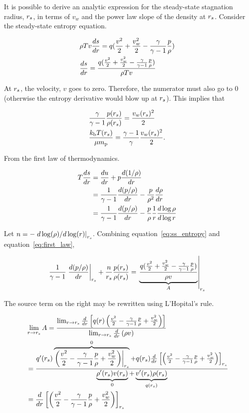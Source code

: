 It is possible to derive an analytic expression for the steady-state
stagnation radius, $r_s$, in terms of $v_w$ and the power law slope of
the density at $r_s$.  Consider the steady-state entropy equation.

\begin{align}
&\rho T v \frac{d s}{d r}=q (\frac{v^2}{2}+\frac{v_w^2}{2}-\frac{\gamma}{\gamma-1} \frac{p}{\rho})\\
&\frac{d s}{d r}=\frac{q (\frac{v^2}{2}+\frac{v_w^2}{2}-\frac{\gamma}{\gamma-1} \frac{p}{\rho})}{\rho T v} \label{eq:ss_entropy}
\end{align}

At $r_s$, the velocity, $v$ goes to zero.  Therefore, the numerator
must also go to 0 (otherwise the entropy derivative would blow up at
$r_s$). This implies that

\begin{align}
 &\frac{\gamma}{\gamma-1} \frac{p(r_s)}{\rho(r_s)}=\frac{v_w(r_s)^2}{2} \\
 &\frac{k_{\rm b} T(r_s)}{\mu m_{\rm p}}=\frac{\gamma-1}{\gamma} \frac{v_w(r_s)^2}{2} .
\label{eq:appTanalytic}
\end{align}

From the first law of thermodynamics.

\begin{align}
T\frac{d s}{d r}&=\frac{d u}{d r}+p\frac{d (1/\rho)}{d r}\\
&=\frac{1}{\gamma-1}\frac{d (p/\rho)}{d r}-\frac{p}{\rho^2}\frac{d \rho}{d r}\\
&=\frac{1}{\gamma-1}\frac{d (p/\rho)}{d r}-\frac{p}{\rho} \frac{1}{r} \frac{d \log{\rho}}{d \log{r}} \label{eq:first_law}
\end{align}

Let $n=-\left.d\log(\rho)/d\log(r)\right|_{r_s}$. Combining equation~\ref{eq:ss_entropy} and equation~\ref{eq:first_law},

\begin{align}
\frac{1}{\gamma-1}\left.\frac{d (p/\rho)}{d r}\right|_{r_s}+\frac{n}{r_s}  \frac{p(r_s)}{\rho(r_s)}=\left.\underbrace{\frac{q (\frac{v^2}{2}+\frac{v_w^2}{2}-\frac{\gamma}{\gamma-1} \frac{p}{\rho})}{\rho  v}}_{A}\right|_{r_s} \label{eq:combo1}
\end{align}

The source term on the right may be rewritten using L'Hopital's rule. 

\begin{align}
  &\lim_{r \rightarrow r_s} A=\frac{\lim_{r \rightarrow r_s}
    \frac{d}{dr}\left[q (r)\left(\frac{v^2}{2} -\frac{\gamma}{\gamma-1}
        \frac{p}{\rho}+\frac{v_w^2}{2}\right)\right]}{\lim_{r \rightarrow r_s}
    \frac{d}{dr} \left(\rho v\right)}\\
  &=\frac{ q'(r_s) \overbrace{\left.\left(\frac{v^2}{2}
        -\frac{\gamma}{\gamma-1}\frac{p}{\rho}+\frac{v_w^2}{2}\right)\right|_{r_s}}^0+ q(r_s)
    \frac{d}{dr} \left[\left(\frac{v^2}{2} -\frac{\gamma}{\gamma-1}
        \frac{p}{\rho}+\frac{v_w^2}{2}\right)\right]_{r_s}}{\underbrace{\rho'(r_s)
      v(r_s)}_0 +\underbrace{v'(r_s)\rho(r_s)}_{q(r_s)}}\\
  &= \frac{d}{dr} \left[\left(\frac{v^2}{2} -\frac{\gamma}{\gamma-1} \frac{p}{\rho}+\frac{v_w^2}{2}\right)\right]_{r_s}
\end{align}

